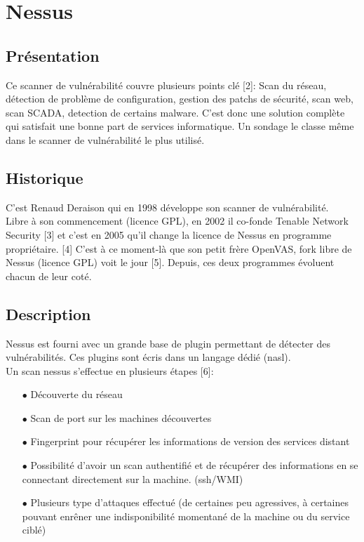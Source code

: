 \section{Nessus}
\thispagestyle{plain}
\subsection{Présentation}
Ce scanner de vulnérabilité couvre plusieurs points clé [2]: Scan du réseau, détection de problème de configuration, gestion des patchs de sécurité, scan web, scan SCADA, detection de certains malware. C’est donc une solution complète qui satisfait une bonne part de services informatique. Un sondage le classe même dans le scanner de vulnérabilité le plus utilisé.

\subsection{Historique}
C’est Renaud Deraison qui en 1998 développe son scanner de vulnérabilité.\\
Libre à son commencement (licence GPL), en 2002 il co-fonde Tenable Network Security [3] et c’est en 2005 qu’il change la licence de Nessus en programme propriétaire. [4] C’est à ce moment-là que son petit frère OpenVAS, fork libre de Nessus (licence GPL) voit le jour [5]. Depuis, ces deux programmes évoluent chacun de leur coté.

\subsection{Description}
Nessus est fourni avec un grande base de plugin permettant de détecter des vulnérabilités. Ces plugins sont écris dans un langage dédié (nasl).\\
Un scan nessus s’effectue en plusieurs étapes [6]:\\
\begin{itemize}
\item [$\bullet$]Découverte du réseau\\
\item [$\bullet$]Scan de port sur les machines découvertes\\
\item [$\bullet$]Fingerprint pour récupérer les informations de version des services distant\\
\item [$\bullet$]Possibilité d’avoir un scan authentifié et de récupérer des informations en se connectant directement sur la machine. (ssh/WMI)\\
\item [$\bullet$]Plusieurs type d’attaques effectué (de certaines peu agressives, à certaines pouvant enrêner une indisponibilité momentané de la machine ou du service ciblé)\\
\end{itemize}

